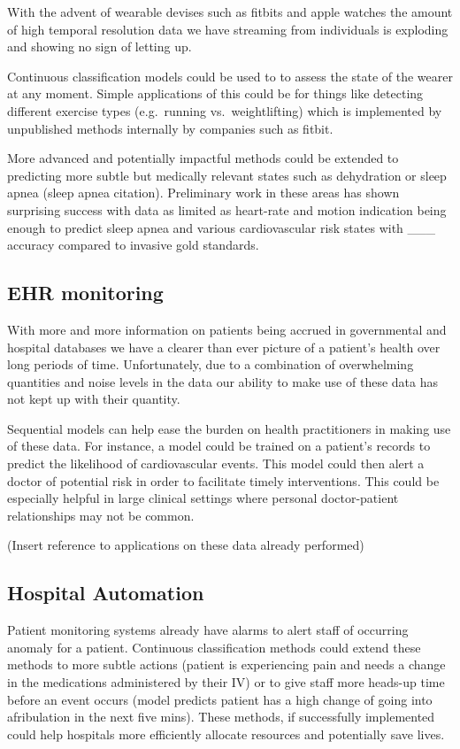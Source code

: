 \documentclass[]{book}
\theoremstyle{definition}
\theoremstyle{definition}
\theoremstyle{definition}
\theoremstyle{remark}
\begin{document}
With the advent of wearable devises such as fitbits and apple watches
the amount of high temporal resolution data we have streaming from
individuals is exploding and showing no sign of letting up.

Continuous classification models could be used to to assess the state of
the wearer at any moment. Simple applications of this could be for
things like detecting different exercise types (e.g.~running
vs.~weightlifting) which is implemented by unpublished methods
internally by companies such as fitbit.

More advanced and potentially impactful methods could be extended to
predicting more subtle but medically relevant states such as dehydration
or sleep apnea (sleep apnea citation). Preliminary work in these areas
has shown surprising success with data as limited as heart-rate and
motion indication being enough to predict sleep apnea and various
cardiovascular risk states with \_\_\_ accuracy compared to invasive
gold standards.

\subsection{EHR monitoring}\label{ehr-monitoring}

With more and more information on patients being accrued in governmental
and hospital databases we have a clearer than ever picture of a
patient's health over long periods of time. Unfortunately, due to a
combination of overwhelming quantities and noise levels in the data our
ability to make use of these data has not kept up with their quantity.

Sequential models can help ease the burden on health practitioners in
making use of these data. For instance, a model could be trained on a
patient's records to predict the likelihood of cardiovascular events.
This model could then alert a doctor of potential risk in order to
facilitate timely interventions. This could be especially helpful in
large clinical settings where personal doctor-patient relationships may
not be common.

(Insert reference to applications on these data already performed)

\subsection{Hospital Automation}\label{hospital-automation}

Patient monitoring systems already have alarms to alert staff of
occurring anomaly for a patient. Continuous classification methods could
extend these methods to more subtle actions (patient is experiencing
pain and needs a change in the medications administered by their IV) or
to give staff more heads-up time before an event occurs (model predicts
patient has a high change of going into afribulation in the next five
mins). These methods, if successfully implemented could help hospitals
more efficiently allocate resources and potentially save lives.
\end{document}
